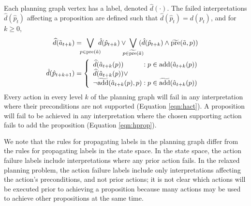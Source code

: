 \documentclass[letterpaper]{article}
\begin{document}
Each planning graph vertex has a label, denoted $\hat{d}(\cdot)$.  The failed
interpretations $\hat{d}(\hat{p}_t) $ affecting a proposition are defined such
that $\hat{d}(\hat{p}_t) = d(p_t)$, and for $k \geq 0$,
\begin{align}
\widehat{d}(\tilde{a}_{t+k}) &= \hspace*{-.2cm} 
\bigvee\limits_{p \in \text{pre}(\tilde{a}) } \hspace*{-.2cm}   \hat{d}(\hat{p}_{t+k}) \vee \hspace*{-.25cm} 
\bigvee\limits_{p \in \widetilde{\text{pre}}(\tilde{a})} \hspace*{-.25cm}  (\hat{d}(\hat{p}_{t+k})  \wedge  \widetilde{\text{pre}}(\tilde{a}, p) )\label{eqn:hact}\\
 \hspace*{-.6cm} \hat{d}(\hat{p}_{t+k+1}) &= 
\left\{\begin{array}{l@{\;}l@{\;}r}
\widehat{d}(\hat{a}_{t+k}(p)) & : p \in \text{add}(\hat{a}_{t+k}(p))\\
\widehat{d}(\hat{a}_{t+k}(p)) \vee \\
\neg\widetilde{\text{add}}(\hat{a}_{t+k}(p), p) & : p \in \widetilde{\text{add}}(\hat{a}_{t+k}(p))\end{array}\right. \hspace*{-.1cm}\label{eqn:hprop}
\end{align}
\noindent Every action in every level $k$ of the planning graph will fail in any
interpretation where their preconditions are not supported (Equation
\ref{eqn:hact}).  A proposition will fail to be achieved in any interpretation
where the chosen supporting action fails to add the proposition (Equation
\ref{eqn:hprop}).

We note that the rules for propagating labels in the planning graph differ from
the rules for propagating labels in the state space.  In the state space, the
action failure labels include interpretations where any prior action fails.  In
the relaxed planning problem, the action failure labels include only
interpretations affecting the action's preconditions, and not prior actions; it
is not clear which actions will be executed prior to achieving a proposition
because many actions may be used to achieve other propositions at the same time.
\end{document}
